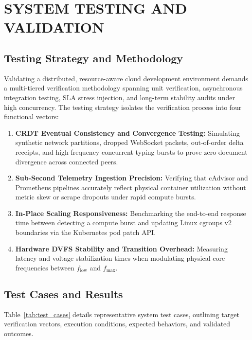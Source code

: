 \documentclass[12pt,a4paper]{report}
\begin{document}
	\chapter{SYSTEM TESTING AND VALIDATION}
	
	\section{Testing Strategy and Methodology}
	Validating a distributed, resource-aware cloud development environment demands a multi-tiered verification methodology spanning unit verification, asynchronous integration testing, SLA stress injection, and long-term stability audits under high concurrency. The testing strategy isolates the verification process into four functional vectors:
	\begin{enumerate}
		\item \textbf{CRDT Eventual Consistency and Convergence Testing:} Simulating synthetic network partitions, dropped WebSocket packets, out-of-order delta receipts, and high-frequency concurrent typing bursts to prove zero document divergence across connected peers.
		\item \textbf{Sub-Second Telemetry Ingestion Precision:} Verifying that cAdvisor and Prometheus pipelines accurately reflect physical container utilization without metric skew or scrape dropouts under rapid compute bursts.
		\item \textbf{In-Place Scaling Responsiveness:} Benchmarking the end-to-end response time between detecting a compute burst and updating Linux cgroups v2 boundaries via the Kubernetes pod patch API.
		\item \textbf{Hardware DVFS Stability and Transition Overhead:} Measuring latency and voltage stabilization times when modulating physical core frequencies between $f_{\text{low}}$ and $f_{\max}$.
	\end{enumerate}
	
	\section{Test Cases and Results}
	Table~\ref{tab:test_cases} details representative system test cases, outlining target verification vectors, execution conditions, expected behaviors, and validated outcomes.
	
\end{document}

